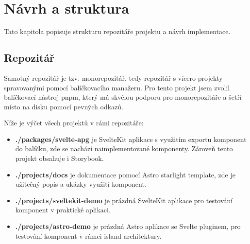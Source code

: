 \chapter{Návrh a struktura}

Tato kapitola popisuje strukturu repozitáře projektu a návrh implementace.

\section{Repozitář}

Samotný repozitář je tzv. monorepozitář, tedy repozitář s vícero projekty spravovanými pomocí balíčkovacího manažeru.
Pro tento projekt jsem zvolil balíčkovací nástroj pnpm, který má skvělou podporu pro monorepozitáře a šetří místo na disku pomocí pevných odkazů.

Níže je výčet všech projektů v rámi repozitáře:


\begin{itemize}
    \item \textbf{./packages/svelte-apg} je SvelteKit aplikace s využitím exportu komponent do balíčku, zde se nachází naimplementované komponenty. Zároveň tento projekt obsahuje i Storybook.
    \item \textbf{./projects/docs} je dokumentace pomocí Astro starlight template, zde je užitečný popis a ukázky využití komponent.
    \item \textbf{./projects/sveltekit-demo} je prázdná SvelteKit aplikace pro testování komponent v praktické aplikaci.
    \item \textbf{./projects/astro-demo} je prázdná Astro aplikace se Svelte pluginem, pro testování komponent v rámci island architektury.
\end{itemize}




